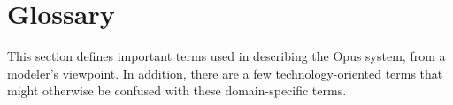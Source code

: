 

\chapter{Glossary}

This section defines important terms used in describing the Opus system,
from a modeler's viewpoint.  In addition, there are a few
technology-oriented terms that might otherwise be confused with these
domain-specific terms.

